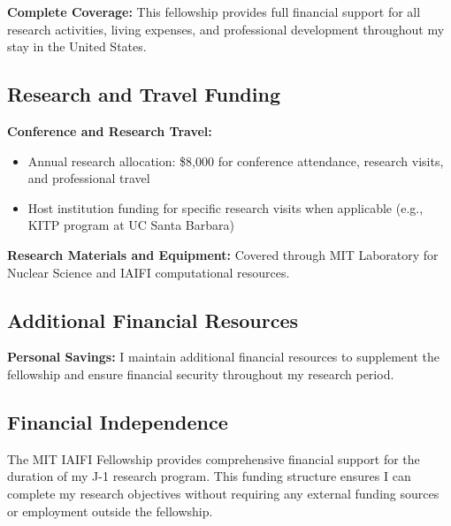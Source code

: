 \documentclass[11pt]{article}
\begin{document}
\textbf{Complete Coverage:} This fellowship provides full financial support for all research activities, living expenses, and professional development throughout my stay in the United States.

\subsection*{Research and Travel Funding}

\textbf{Conference and Research Travel:}
\begin{itemize}[noitemsep]
\item Annual research allocation: \$8,000 for conference attendance, research visits, and professional travel
\item Host institution funding for specific research visits when applicable (e.g., KITP program at UC Santa Barbara)
\end{itemize}

\textbf{Research Materials and Equipment:} Covered through MIT Laboratory for Nuclear Science and IAIFI computational resources.

\subsection*{Additional Financial Resources}

\textbf{Personal Savings:} I maintain additional financial resources to supplement the fellowship and ensure financial security throughout my research period.

\subsection*{Financial Independence}

The MIT IAIFI Fellowship provides comprehensive financial support for the duration of my J-1 research program. This funding structure ensures I can complete my research objectives without requiring any external funding sources or employment outside the fellowship.
\end{document}
